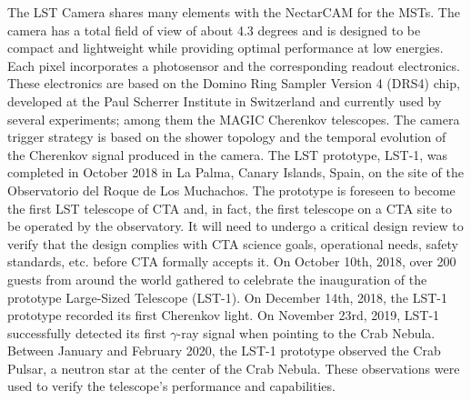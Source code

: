 The LST Camera shares many elements with the NectarCAM for the MSTs. The camera has a total field of view of about 4.3 degrees and is designed to be compact and lightweight while providing optimal performance at low energies. Each pixel incorporates a photosensor and the corresponding readout electronics. These electronics are based on the Domino Ring Sampler Version 4 (DRS4) chip, developed at the Paul Scherrer Institute in Switzerland and currently used by several experiments; among them the MAGIC Cherenkov telescopes. The camera trigger strategy is based on the shower topology and the temporal evolution of the Cherenkov signal produced in the camera. The LST prototype, LST-1, was completed in October 2018 in La Palma, Canary Islands, Spain, on the site of the Observatorio del Roque de Los Muchachos. The prototype is foreseen to become the first LST telescope of CTA and, in fact, the first telescope on a CTA site to be operated by the observatory. It will need to undergo a critical design review to verify that the design complies with CTA science goals, operational needs, safety standards, etc. before CTA formally accepts it.
On October 10th, 2018, over 200 guests from around the world gathered to celebrate the inauguration of the prototype Large-Sized Telescope (LST-1). On December 14th, 2018, the LST-1 prototype recorded its first Cherenkov light. On November 23rd, 2019, LST-1 successfully detected its first $\gamma$-ray signal when pointing to the Crab Nebula. Between January and February 2020, the LST-1 prototype observed the Crab Pulsar, a neutron star at the center of the Crab Nebula. These observations were used to verify the telescope's performance and capabilities.

